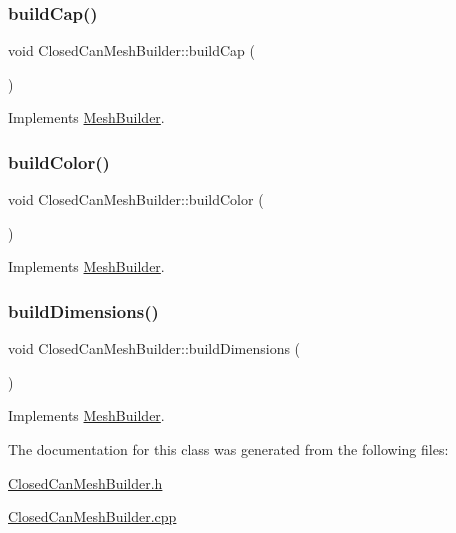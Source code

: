 \subsubsection{\texorpdfstring{buildCap()}{buildCap()}}
{\footnotesize\ttfamily void Closed\+Can\+Mesh\+Builder\+::build\+Cap (\begin{DoxyParamCaption}{ }\end{DoxyParamCaption})\hspace{0.3cm}{\ttfamily [virtual]}}



Implements \mbox{\hyperlink{class_mesh_builder_a5c69dabcf61fa1e87aa8b20fe2f54fe7}{Mesh\+Builder}}.

\mbox{\label{class_closed_can_mesh_builder_ae99058cb912a5d9e1f34e49241f4c8c7}} 
\subsubsection{\texorpdfstring{buildColor()}{buildColor()}}
{\footnotesize\ttfamily void Closed\+Can\+Mesh\+Builder\+::build\+Color (\begin{DoxyParamCaption}{ }\end{DoxyParamCaption})\hspace{0.3cm}{\ttfamily [virtual]}}



Implements \mbox{\hyperlink{class_mesh_builder_a205a6daf8b50d88eebe1df434b7bf0c4}{Mesh\+Builder}}.

\mbox{\label{class_closed_can_mesh_builder_a5d9a174577e0957f768300b32fd367cf}} 
\subsubsection{\texorpdfstring{buildDimensions()}{buildDimensions()}}
{\footnotesize\ttfamily void Closed\+Can\+Mesh\+Builder\+::build\+Dimensions (\begin{DoxyParamCaption}{ }\end{DoxyParamCaption})\hspace{0.3cm}{\ttfamily [virtual]}}



Implements \mbox{\hyperlink{class_mesh_builder_af715a8510c99c7925bd8e6f0b6b182d7}{Mesh\+Builder}}.



The documentation for this class was generated from the following files\+:\begin{DoxyCompactItemize}
\item 
\mbox{\hyperlink{_closed_can_mesh_builder_8h}{Closed\+Can\+Mesh\+Builder.\+h}}\item 
\mbox{\hyperlink{_closed_can_mesh_builder_8cpp}{Closed\+Can\+Mesh\+Builder.\+cpp}}\end{DoxyCompactItemize}
